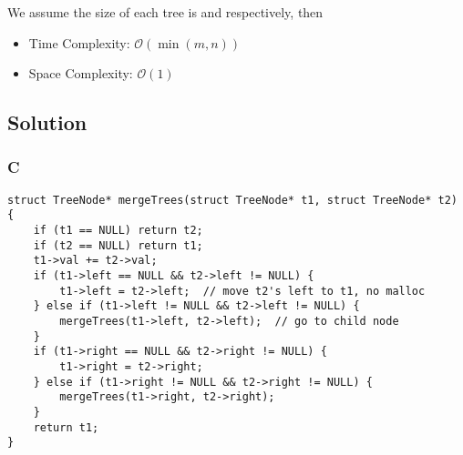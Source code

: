 We assume the size of each tree is  and  respectively, then
\begin{itemize}
\item Time Complexity: $\mathcal{O}(\min(m, n))$
\item Space Complexity: $\mathcal{O}(1)$
\end{itemize}

\subsection*{Solution}
\subsubsection*{C}
\begin{verbatim}
struct TreeNode* mergeTrees(struct TreeNode* t1, struct TreeNode* t2) {
    if (t1 == NULL) return t2;
    if (t2 == NULL) return t1;
    t1->val += t2->val;
    if (t1->left == NULL && t2->left != NULL) {
        t1->left = t2->left;  // move t2's left to t1, no malloc
    } else if (t1->left != NULL && t2->left != NULL) {
        mergeTrees(t1->left, t2->left);  // go to child node
    }
    if (t1->right == NULL && t2->right != NULL) {
        t1->right = t2->right;
    } else if (t1->right != NULL && t2->right != NULL) {
        mergeTrees(t1->right, t2->right);
    }
    return t1;
}
\end{verbatim}
\newpage

